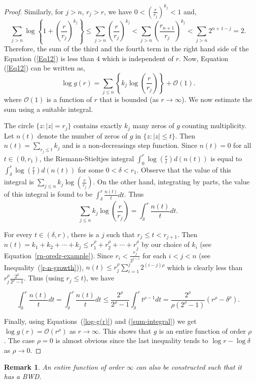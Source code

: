\documentclass[11pt,a4paper]{article}
\newtheorem{Remark}{Remark}[section]
\begin{document}
\begin{proof}
	Similarly, for $j> n$, $r_j> r$, we have $0<\left(\frac{r}{r_j}\right)^{k_j}<1$ and, $$\sum_{j> n}\log\left\{ 1+ \left(\frac{r}{r_j}\right)^{k_j}\right\}\leq \sum_{j> n}\left(\frac{r}{r_j}\right)^{k_j} < \sum_{j> n }\left(\frac{r_{n+1}}{r_j}\right)^{k_j}< \sum_{j>n} 2^{n+1-j}=2 .$$
	Therefore, the sum of the third and the fourth term  in the right hand side of the Equation (\ref{Eq12}) is less than $4$ which is independent of $r$. Now, Equation (\ref{Eq12}) can be written as,
\begin{equation}
\log g(r)=\sum_{j\leq n}\left\{k_j\log\left(\frac{r}{r_j}\right)\right\}+\mathcal{O}(1).
\label{log-g(r)}
	\end{equation}	
	where $\mathcal{O}(1)$ is a function of $r$ that is bounded (as $r\to\infty$). We now estimate the sum using a suitable integral.
\par The circle $\{z: |z|=r_j\}$ contains exactly $k_j$ many zeros of $g$ counting multiplicity.	
Let $n(t)$ denote the number of zeros of $g$ in $\{z:|z|\leq t\}$. Then $n(t)=\sum_{r_j \leq t} k_j$ and is a non-decreasings step function. Since $n(t)=0$ for all $t\in (0, r_1)$, the Riemann-Stieltjes integral
	$\int_{0}^{r}\log\left(\frac{r}{t}\right)d(n(t)) $ is equal to $\int_{\delta}^{r}  \log\left(\frac{r}{t}\right)d(n(t))$ for some $0< \delta < r_1$. Observe that the value of this integral is $\sum_{j\leq n} k_j\log\left( \frac{r}{r_j}\right)$. On the other hand, integrating by parts, the value of this integral is found to be $\int_{\delta}^{r} \frac{n(t)}{t} dt$. Thus \begin{equation}
		\sum_{j\leq n} k_j\log\left( \frac{r}{r_j}\right) = \int_{\delta}^{r} \frac{n(t)}{t} dt.
		\label{sum-integral}
	\end{equation}
\par For every $t \in (\delta, r)$, there is a $j$ such that $r_j \leq t < r_{j+1}$. Then $n(t)=k_1+k_2+\cdots+k_j  \leq r_1 ^{\rho} + r_2 ^{\rho}+\cdots  +r_j ^{\rho}$ by our choice of $k_i$ (see Equation~\ref{rn-oredr-example}). Since $r_i < \frac{r_j}{2^{j-i}}$ for each $i<j <n$ (see Inequality~(\ref{r-n-growth})), $n(t) \leq r_j ^\rho \sum_{i=1}^{j} 2^{(i-j)\rho}$ which is clearly less than $r_j ^\rho \frac{2^\rho}{2^{\rho}-1}$. Thus (using $r_j \leq t$),  
 we have
	
	 $$\int_{0}^{r}\frac{n(t)}{t}dt=\int_{\delta}^{r}\frac{n(t)}{t}dt \leq\frac{2^\rho}{2^{\rho}-1}  \int_{\delta}^{r}t^{\rho -1}dt = \frac{2^\rho}{\rho(2^{\rho}-1)} (r^\rho -\delta^\rho).$$ 

	 
	 
	 Finally, using Equations~(\ref{log-g(r)}) and (\ref{sum-integral}) we get $\log g(r)=\mathcal{O}(r^\rho)$ as $r\to\infty$.  This shows that $g$ is an entire function of order $\rho$.	 The case $\rho=0$ is almost obvious since the last inequality tends to $\log r - \log \delta$ as $\rho \to 0$.\end{proof} 
	\begin{Remark}
	An entire function of order $\infty$ can also be constructed such that it has a BWD. 
		\end{Remark}
		
\end{document}
